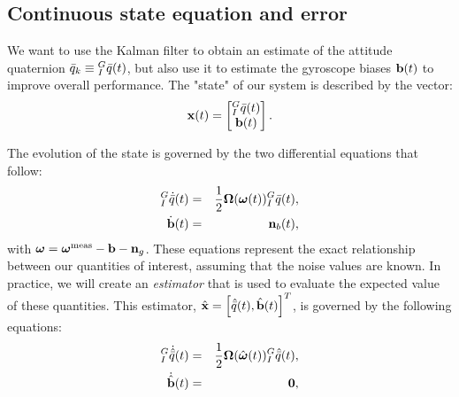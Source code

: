 


\subsection{Continuous state equation and error}

We want to use the Kalman filter to obtain an estimate of the attitude quaternion $\bar{q}_k \equiv {}_{I}^{G}\bar{q}(t)$, but also use it to estimate the gyroscope biases $\textrm{\textbf{b}}(t)$ to improve overall performance. The "state" of our system is described by the vector:
\begin{equation}
\textrm{\textbf{x}}(t) = \begin{bmatrix} {}_{I}^{G}\bar{q}(t) \\ \textrm{\textbf{b}}(t) \end{bmatrix}.
\end{equation}

The evolution of the state is governed by the two differential equations that follow:
\begin{eqnarray}
{}_{I}^{G}\dot{\bar{q}}(t) & = &\frac{1}{2}\boldsymbol\Omega(\boldsymbol\omega(t)){}_{I}^{G}\bar{q}(t),\\
\dot{\textrm{\textbf{b}}}(t) & = & \textbf{n}_b(t),
\end{eqnarray}
with $\boldsymbol\omega = \boldsymbol\omega^\textrm{meas} - \textrm{\textbf{b}} - \textbf{n}_g$. These equations represent the exact relationship between our quantities of interest, assuming that the noise values are known. In practice, we will create an \textit{estimator} that is used to evaluate the expected value of these quantities. This estimator, $\hat{\textrm{\textbf{x}}} = \left[\hat{\bar{q}}(t) , \hat{\textrm{\textbf{b}}}(t)\right]^T$, is governed by the following equations:
\begin{eqnarray}
{}_{I}^{G}\dot{\hat{\bar{q}}}(t) & = &\frac{1}{2}\boldsymbol\Omega(\hat{\boldsymbol\omega}(t)){}_{I}^{G}\hat{\bar{q}}(t),\\
\dot{\hat{\textrm{\textbf{b}}}}(t) & = & \boldsymbol{0},
\end{eqnarray}



